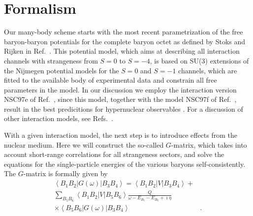 \section{Formalism}
\label{sec:sec2}


Our many-body scheme starts with the most recent
parametrization
of the free baryon-baryon potentials
for the complete  baryon octet
as defined by Stoks and Rijken in Ref.\
\cite{sr99}.
This potential model, which aims at describing all
interaction channels
with strangeness from $S=0$ to $S=-4$,
is based on SU(3) extensions
of the Nijmegen potential models \cite{rsy98}
for the $S=0$ and $S=-1$ channels, which
are fitted to the available body of experimental
data and constrain all free parameters in the model.
In our discussion we employ
the interaction version NSC97e of Ref.\ \cite{sr99}, since this
model, together with the model NSC97f of Ref.\ \cite{sr99}, result in
the best predicitions for hypernuclear observables \cite{rsy98}.
For a discussion of other interaction models, see Refs.\ 
\cite{sr99,sl99}.

With a given interaction model,
the next step is to introduce effects from the nuclear medium.
Here we will construct the so-called $G$-matrix, which
takes into account short-range correlations for all strangeness
sectors, and solve the equations for the single-particle energies
of the various baryons self-consistently.
The $G$-matrix is formally given by
\begin{eqnarray}
   \left\langle B_1B_2\right |G(\omega)\left | B_3B_4 \right\rangle=
   \left\langle B_1B_2\right |V\left | B_3B_4 \right\rangle+&\nonumber\\
   \sum_{B_5B_6}\left\langle B_1B_2\right |V\left | B_5B_6 \right\rangle
   \frac{Q}{\omega-E_{B_5}-E_{B_6}+ \imath\eta}&\nonumber\\
   \times\left\langle B_5B_6\right |G(\omega)\left | B_3B_4 \right\rangle&.
   \label{eq:gmatrix}
\end{eqnarray}

